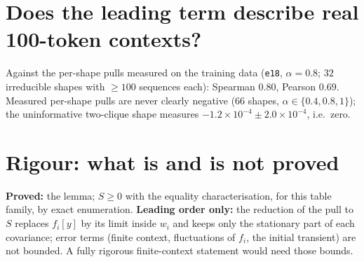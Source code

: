 \documentclass[11pt]{article}
\theoremstyle{remark}\newtheorem{remark}{Remark}
\newcommand{\1}{\mathbf{1}}
\begin{document}
\section{Does the leading term describe real 100-token contexts?}
Against the per-shape pulls measured on the training data (\texttt{e18}, $\alpha=0.8$; $32$ irreducible
shapes with $\ge100$ sequences each): Spearman $0.80$, Pearson $0.69$. Measured per-shape pulls are
never clearly negative ($66$ shapes, $\alpha\in\{0.4,0.8,1\}$); the uninformative two-clique shape
measures $-1.2\times10^{-4}\pm2.0\times10^{-4}$, i.e.\ zero.

\section{Rigour: what is and is not proved}
\textbf{Proved:} the lemma; $S\ge0$ with the equality characterisation, for this table family, by
exact enumeration. \textbf{Leading order only:} the reduction of the pull to $S$ replaces $f_i[y]$ by its
limit inside $w_i$ and keeps only the stationary part of each covariance; error terms (finite context,
fluctuations of $f_i$, the initial transient) are not bounded. A fully rigorous finite-context
statement would need those bounds.
\end{document}
